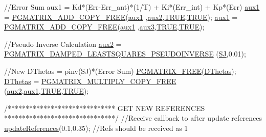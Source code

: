 \begin{DoxyCode}
                \textcolor{comment}{//Error Sum     aux1 = Kd*(Err-Err\_ant)*(1/T) + Ki*(Err\_int) +
       Kp*(Err)}
                \hyperlink{classCartesian__controller_a37edb9c6e2a5066f74941e3659f68cbc}{aux1} = \hyperlink{gmatrix__plus_8h_aa1123306aa55d942955e09156db757a3}{PGMATRIX\_ADD\_COPY\_FREE}(\hyperlink{classCartesian__controller_a37edb9c6e2a5066f74941e3659f68cbc}{aux1}
      ,\hyperlink{classCartesian__controller_af73a0c910cd80ed2f84974b65beba450}{aux2},\hyperlink{gmatlabdatafile_8h_aa8cecfc5c5c054d2875c03e77b7be15d}{TRUE},\hyperlink{gmatlabdatafile_8h_aa8cecfc5c5c054d2875c03e77b7be15d}{TRUE});
                \hyperlink{classCartesian__controller_a37edb9c6e2a5066f74941e3659f68cbc}{aux1} = \hyperlink{gmatrix__plus_8h_aa1123306aa55d942955e09156db757a3}{PGMATRIX\_ADD\_COPY\_FREE}(\hyperlink{classCartesian__controller_a37edb9c6e2a5066f74941e3659f68cbc}{aux1}
      ,\hyperlink{classCartesian__controller_aa37c15fcd53a60ecce106cd9b39d3501}{aux3},\hyperlink{gmatlabdatafile_8h_aa8cecfc5c5c054d2875c03e77b7be15d}{TRUE},\hyperlink{gmatlabdatafile_8h_aa8cecfc5c5c054d2875c03e77b7be15d}{TRUE});

                \textcolor{comment}{//Pseudo Inverse Calculation}
                \hyperlink{classCartesian__controller_af73a0c910cd80ed2f84974b65beba450}{aux2} =      \hyperlink{gmatrix__plus_8h_a73bceba2ac1f3a5589628d0f2e4081fa}{PGMATRIX\_DAMPED\_LEASTSQUARES\_PSEUDOINVERSE}
      (\hyperlink{classCartesian__controller_a98fdac06d136ac3dba0102d97cd5dd36}{SJ},0.01);

                \textcolor{comment}{//New DThetas = pinv(SJ)*(Error Sum)}
                \hyperlink{gmatrix_8h_a9a73b4e0a77f386c0bae1bba75298d1d}{PGMATRIX\_FREE}(\hyperlink{classCartesian__controller_a5d6419e62e130150edfcbd82b1dadcae}{DThetas});
                \hyperlink{classCartesian__controller_a5d6419e62e130150edfcbd82b1dadcae}{DThetas} = \hyperlink{gmatrix__plus_8h_a17b482a0aaa68d1f4c1c30a1a72dacbb}{PGMATRIX\_MULTIPLY\_COPY\_FREE}
      (\hyperlink{classCartesian__controller_af73a0c910cd80ed2f84974b65beba450}{aux2},\hyperlink{classCartesian__controller_a37edb9c6e2a5066f74941e3659f68cbc}{aux1},\hyperlink{gmatlabdatafile_8h_aa8cecfc5c5c054d2875c03e77b7be15d}{TRUE},\hyperlink{gmatlabdatafile_8h_aa8cecfc5c5c054d2875c03e77b7be15d}{TRUE});

                \textcolor{comment}{/******************************}
\textcolor{comment}{                         GET NEW REFERENCES}
\textcolor{comment}{                *******************************/}
                \textcolor{comment}{//Receive callback to after update references}
                \hyperlink{classCartesian__velocity__controller_a9b2c7f25b3fc2882f7e4590ee97e0978}{updateReferences}(0.1,0.35); \textcolor{comment}{//Refs should be
       received as 1}


\end{DoxyCode}
